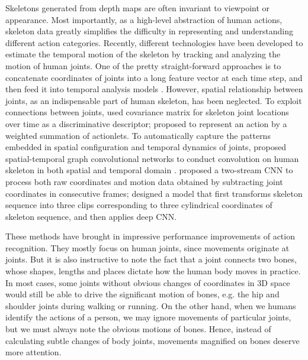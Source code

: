 \documentclass[a4paper,11pt]{article}
\begin{document}
Skeletons generated from depth maps are often invariant to viewpoint or appearance. Most importantly, as a high-level abstraction of human actions, skeleton data greatly simplifies the difficulty in representing and understanding different action categories. Recently, different technologies have been developed to estimate the temporal motion of the skeleton by tracking and analyzing the motion of human joints. One of the pretty straight-forward approaches is to concatenate coordinates of joints into a long feature vector at each time step, and then feed it into temporal analysis models \cite{wang2012mining,fernando2015modeling}. However, spatial relationship between joints, as an indispensable part of human skeleton, has been neglected. To exploit connections between joints, \cite{hussein2013human} used covariance matrix for skeleton joint locations over time as a discriminative descriptor; \cite{wang2012mining} proposed to represent an action by a weighted summation of actionlets. To automatically capture the patterns embedded in spatial configuration and temporal dynamics of joints, \cite{yan2018spatial} proposed spatial-temporal graph convolutional networks to conduct convolution on human skeleton in both spatial and temporal domain \cite{li2015gated,scarselli2009graph,bruna2013spectral,henaff2015deep,niepert2016learning}. \cite{li2017skeleton} proposed a two-stream CNN to process both raw coordinates and motion data obtained by subtracting joint coordinates in consecutive frames; \cite{ke2017new} designed a model that first transforms skeleton sequence into three clips corresponding to three cylindrical coordinates of skeleton sequence, and then applies deep CNN. %

These methods have brought in impressive performance improvements of action recognition. They mostly focus on human joints, since movements originate at joints. But it is also instructive to note the fact that a joint connects two bones, whose shapes, lengths and places dictate how the human body moves in practice. In most cases, some joints without obvious changes of coordinates in 3D space would still be able to drive the significant motion of bones, e.g. the hip and shoulder joints during walking or running. On the other hand, when we humans identify the actions of a person, we may ignore movements of particular joints, but we must always note the obvious motions of bones. Hence, instead of calculating subtle changes of body joints, movements magnified on bones deserve more attention.
\end{document}
